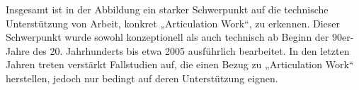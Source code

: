 Insgesamt ist in der Abbildung ein starker Schwerpunkt auf die technische Unterstützung von Arbeit, konkret „Articulation Work“, zu erkennen. Dieser Schwerpunkt wurde sowohl konzeptionell als auch technisch ab Beginn der 90er-Jahre des 20. Jahrhunderts bis etwa 2005 ausführlich bearbeitet. In den letzten Jahren treten verstärkt Fallstudien auf, die einen Bezug zu „Articulation Work“ herstellen, jedoch nur bedingt auf deren Unterstützung eignen.


